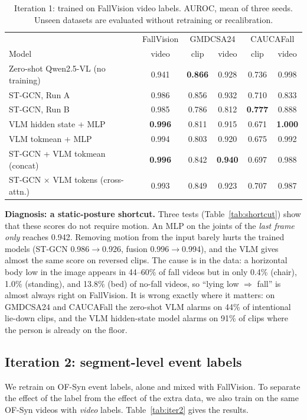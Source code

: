 \begin{table}[t]
  \caption{Iteration 1: trained on FallVision video labels. AUROC, mean of three seeds. Unseen datasets are evaluated without retraining or recalibration.}
  \label{tab:iter1}
  \centering\small
  \begin{tabular*}{\textwidth}{@{\extracolsep{\fill}}lccccc}
    \toprule
    & FallVision & \multicolumn{2}{c}{GMDCSA24} & \multicolumn{2}{c}{CAUCAFall} \\
    Model & video & clip & video & clip & video \\
    \midrule
    Zero-shot Qwen2.5-VL (no training) & 0.941 & \textbf{0.866} & 0.928 & 0.736 & 0.998 \\
    ST-GCN, Run A & 0.986 & 0.856 & 0.932 & 0.710 & 0.833 \\
    ST-GCN, Run B & 0.985 & 0.786 & 0.812 & \textbf{0.777} & 0.888 \\
    VLM hidden state + MLP & \textbf{0.996} & 0.811 & 0.915 & 0.671 & \textbf{1.000} \\
    VLM tokmean + MLP & 0.994 & 0.803 & 0.920 & 0.675 & 0.992 \\
    ST-GCN + VLM tokmean (concat) & \textbf{0.996} & 0.842 & \textbf{0.940} & 0.697 & 0.988 \\
    ST-GCN $\times$ VLM tokens (cross-attn.) & 0.993 & 0.849 & 0.923 & 0.707 & 0.987 \\
    \bottomrule
  \end{tabular*}
\end{table}

\textbf{Diagnosis: a static-posture shortcut.}
Three tests (Table~\ref{tab:shortcut}) show that these scores do not require motion.
An MLP on the joints of the \emph{last frame only} reaches 0.942.
Removing motion from the input barely hurts the trained models (ST-GCN 0.986$\to$0.926, fusion 0.996$\to$0.994), and the VLM gives almost the same score on reversed clips.
The cause is in the data: a horizontal body low in the image appears in 44--60\% of fall videos but in only 0.4\% (chair), 1.0\% (standing), and 13.8\% (bed) of no-fall videos, so ``lying low $\Rightarrow$ fall'' is almost always right on FallVision.
It is wrong exactly where it matters: on GMDCSA24 and CAUCAFall the zero-shot VLM alarms on 44\% of intentional lie-down clips, and the VLM hidden-state model alarms on 91\% of clips where the person is already on the floor.


\subsection{Iteration 2: segment-level event labels}
We retrain on OF-Syn event labels, alone and mixed with FallVision.
To separate the effect of the label from the effect of the extra data, we also train on the same OF-Syn videos with \emph{video} labels.
Table~\ref{tab:iter2} gives the results.

